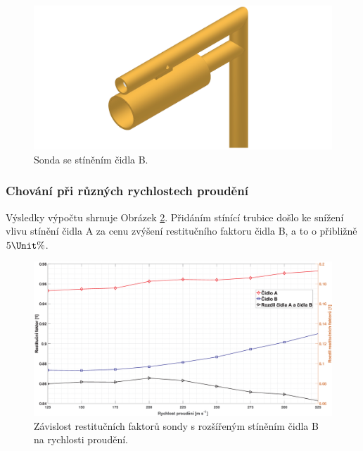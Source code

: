        \begin{figure}[ht!]
            \centering
            \includegraphics[width=\textwidth]{400_SIMULACE_KONSTRUKCNICH_UPRAV/Vykresy_rendery/Sonda_s_rozsirenym_stinenim_B.png}
            \caption{Sonda se stíněním čidla B.}
            \label{fig:sonda-s-rozsirenym-stinenim-B}
        \end{figure}
        
        \subsubsection{Chování při různých rychlostech proudění}
            Výsledky výpočtu shrnuje Obrázek \ref{fig:sonda-s-rosirenym-stinenim-rychlosti}. Přidáním stínící trubice došlo ke snížení vlivu stínění čidla A za cenu zvýšení restitučního faktoru čidla B, a to o přibližně $5 \Unit{\%}$.
            
            \begin{figure}[ht!]
                \centering
                \includegraphics*[width=\textwidth]{400_SIMULACE_KONSTRUKCNICH_UPRAV/Grafy/03_rychlosti.eps}
                \caption{Závislost restitučních faktorů sondy s rozšířeným stíněním čidla B na rychlosti proudění.}
                \label{fig:sonda-s-rosirenym-stinenim-rychlosti}
            \end{figure}

